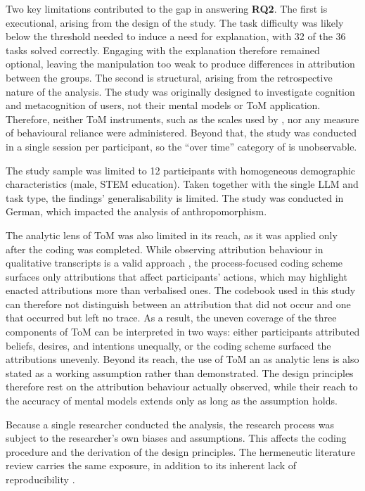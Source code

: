 Two key limitations contributed to the gap in answering \textbf{RQ2}. The first is executional, arising from the design of the study. The task difficulty was likely below the threshold needed to induce a need for explanation, with 32 of the 36 tasks solved correctly. Engaging with the explanation therefore remained optional, leaving the manipulation too weak to produce differences in attribution between the groups. The second is structural, arising from the retrospective nature of the analysis. The study was originally designed to investigate cognition and metacognition of users, not their mental models or \ac{ToM} application. Therefore, neither \ac{ToM} instruments, such as the scales used by \textcite{Colombatto2025}, nor any measure of behavioural reliance were administered. Beyond that, the study was conducted in a single session per participant, so the \enquote{over time} category of \textcite{Amershi2019} is unobservable.

The study sample was limited to 12 participants with homogeneous demographic characteristics (male, \ac{STEM} education). Taken together with the single \ac{LLM} and task type, the findings' generalisability is limited. The study was conducted in German, which impacted the analysis of anthropomorphism.

The analytic lens of \ac{ToM} was also limited in its reach, as it was applied only after the coding was completed. While observing attribution behaviour in qualitative transcripts is a valid approach \parencite{deGraaf2019}, the process-focused coding scheme surfaces only attributions that affect participants' actions, which may highlight enacted attributions more than verbalised ones. The codebook used in this study can therefore not distinguish between an attribution that did not occur and one that occurred but left no trace. As a result, the uneven coverage of the three components of \ac{ToM} can be interpreted in two ways: either participants attributed beliefs, desires, and intentions unequally, or the coding scheme surfaced the attributions unevenly. Beyond its reach, the use of \ac{ToM} an as analytic lens is also stated as a working assumption rather than demonstrated. The design principles therefore rest on the attribution behaviour actually observed, while their reach to the accuracy of mental models extends only as long as the assumption holds.

Because a single researcher conducted the analysis, the research process was subject to the researcher's own biases and assumptions. This affects the coding procedure and the derivation of the design principles. The hermeneutic literature review carries the same exposure, in addition to its inherent lack of reproducibility \parencite{Boell2014}.

